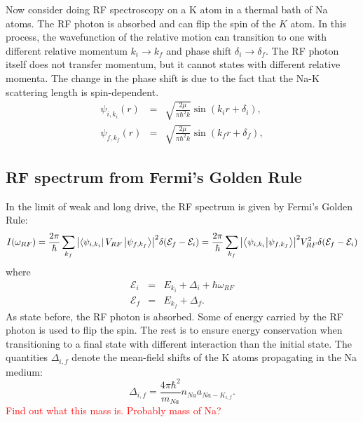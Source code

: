 \documentclass{article}
\theoremstyle{definition}
\newcommand{\f}[2]{\frac{#1}{#2}}
\begin{document}
Now consider doing RF spectroscopy on a K atom in a thermal bath of Na atoms. The RF photon is absorbed and can flip the spin of the $K$ atom. In this process, the wavefunction of the relative motion can transition to one with different relative momentum $k_i \to k_f$ and phase shift $\delta_i \to \delta_f$. The RF photon itself does not transfer momentum, but it cannot states with different relative momenta. The change in the phase shift is due to the fact that the Na-K scattering length is spin-dependent. 
\begin{eqnarray}\label{eq:wfns}
\psi_{i,k_i}(r) &=&  \sqrt{\frac{2\mu}{\pi \hbar^2 k}} \sin(k_ir + \delta_i),\\
\psi_{f,k_f}(r) &=&  \sqrt{\frac{2\mu}{\pi \hbar^2 k}} \sin(k_fr + \delta_f),
\end{eqnarray}

\subsection{RF spectrum from Fermi's Golden Rule}

In the limit of weak and long drive, the RF spectrum is given by Fermi's Golden Rule:
\begin{equation}\label{eq:FGR}
I(\omega_{RF}) = \f{2\pi}{\hbar} \sum_{k_f} \abs{\bra{\psi_{i,k_i}}  V_{RF}  \ket{\psi_{f,k_f}}}^2  \delta(\mathcal{E}_f - \mathcal{E}_i) = \f{2\pi}{\hbar} \sum_{k_f} \abs{\bra{\psi_{i,k_i}}   \ket{\psi_{f,k_f}}}^2 V_{RF}^2  \delta(\mathcal{E}_f - \mathcal{E}_i) 
\end{equation}
where 
\begin{eqnarray}\label{eq:energies}
\mathcal{E}_{i} &=& E_{k_i} + \Delta_i + \hbar \omega_{RF}\\
\mathcal{E}_{f} &=& E_{k_f} + \Delta_f.
\end{eqnarray}
As state before, the RF photon is absorbed. Some of energy carried by the RF photon is used to flip the spin. The rest is to ensure energy conservation when transitioning to a final state with different interaction than the initial state. The quantities $\Delta_{i,f}$ denote the mean-field shifts of the K atoms propagating in the Na medium:
\begin{equation}
\Delta_{i,f} = \f{4\pi \hbar^2}{m_{Na}} n_{Na} a_{Na-K_{i,f}}.
\end{equation}
\textcolor{red}{Find out what this mass is. Probably mass of Na?}\\
\end{document}
